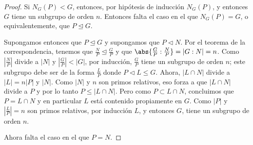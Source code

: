 \begin{proof}
    Si $N_G(P) < G$, entonces, por hipótesis de inducción $N_G(P)$, y entonces $G$ tiene un subgrupo de orden $n$. Entonces
    falta el caso en el que $N_G(P) = G$, o equivalentemente, que $P \trianglelefteq G$.\pn
    
    Supongamos entonces que $P \trianglelefteq G$ y supongamos que $P \triangleleft N$. Por el teorema de la correspondencia, 
    tenemos que $\frac{N}{P} \trianglelefteq \frac{G}{P}$ y que $\abs{\frac{G}{P} : \frac{N}{P}} = | G :N | = n$. Como $|\frac{N}{P}|$
    divide a $|N|$ y $|\frac{G}{P}| < |G|$, por inducción, $\frac{G}{P}$ tiene un subgrupo de orden $n$; este subgrupo debe ser de la forma 
    $\frac{L}{P}$ donde $P \triangleleft L \leq G$. Ahora, $| L \cap N |$ divide a $|L| = n|P|$ y $|N|$. Como $|N|$  y $n$ son primos relativos, 
    eso forza a que $|L \cap N|$ divide a $P$ y por lo tanto $P \leq |L \cap N|$. Pero como $P \subset L \cap N$, concluimos que $P = L \cap N$ y en
    particular $L$ está contenido propiamente en $G$. Como $|P|$ y $| \frac{L}{P}| = n$ son primos relativos, por inducción $L$, y entonces $G$, tiene
    un subgrupo de orden $n$.\pn
    
    Ahora falta el caso en el que $P = N$.
\end{proof}